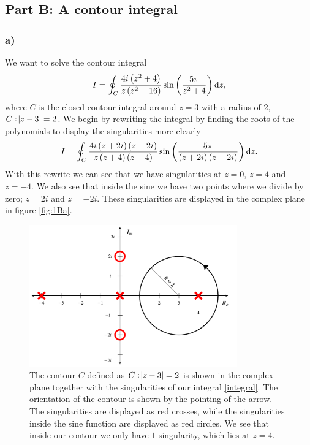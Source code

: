 \documentclass[12pt,twoside]{article}
\begin{document}
\subsection*{Part B: A contour integral}
\subsubsection*{a)}
We want to solve the contour integral
\begin{equation}
  I = \oint_{C}\frac{4i\left(z^2+4\right)}{z\left(z^2-16\right)}\sin{\left( \frac{5\pi}{z^2+4} \right)} \dif z,
\end{equation}
where $C$ is the closed contour integral around $z=3$ with a radius of $2$, $C: \abs{z-3} = 2$. We begin by rewriting the integral by finding the roots of the polynomials to display the singularities more clearly
\begin{equation}
  I = \oint_{C}\frac{4i\left(z+2i\right)\left(z-2i\right)}{z\left(z+4\right)\left(z-4\right)}\sin{\left( \frac{5\pi}{\left(z+2i\right)\left(z-2i\right)} \right)} \dif z. \label{integral}
\end{equation}
With this rewrite we can see that we have singularities at $z=0$, $z=4$ and $z=-4$. We also see that inside the sine we have two points where we divide by zero; $z=2i$ and $z=-2i$. These singularities are displayed in the complex plane in figure \vref{fig:1Ba}.\par
\begin{figure}
  \centering
  \includegraphics[width=0.8\textwidth]{../figures/contour_and_sing.pdf}
  \caption{The contour $C$ defined as $C: \abs{z-3} = 2$ is shown in the complex plane together with the singularities of our integral \eqref{integral}. The orientation of the contour is shown by the pointing of the arrow. The singularities are displayed as red crosses, while the singularities inside the sine function are displayed as red circles. We see that inside our contour we only have $1$ singularity, which lies at $z=4$.}
  \label{fig:1Ba}
\end{figure}
\end{document}
